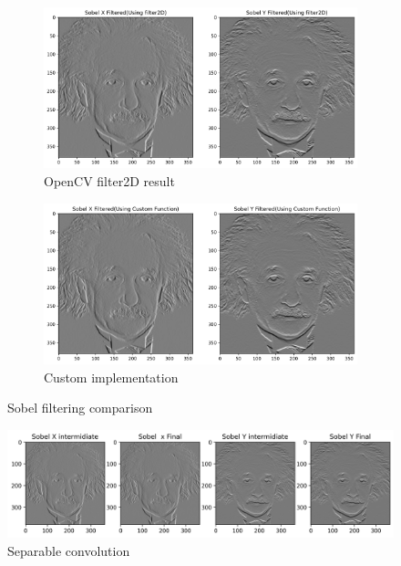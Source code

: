 \documentclass[10pt,a4paper]{article}
\begin{document}
\begin{figure}[H]
    \centering
    \begin{subfigure}{0.48\textwidth}
        \includegraphics[width=\textwidth]{task7/sobel2D_filtered.png}
        \caption{OpenCV filter2D result}
    \end{subfigure}
    \begin{subfigure}{0.48\textwidth}
        \includegraphics[width=\textwidth]{task7/sobel_custom_filtered.png}
        \caption{Custom implementation}
    \end{subfigure}
    \caption{Sobel filtering comparison}
\end{figure}

\begin{figure}[H]
    \centering
    \includegraphics[width=\textwidth]{task7/sobel_combined_filtered.png}
    \caption{Separable convolution}
\end{figure}
\end{document}
